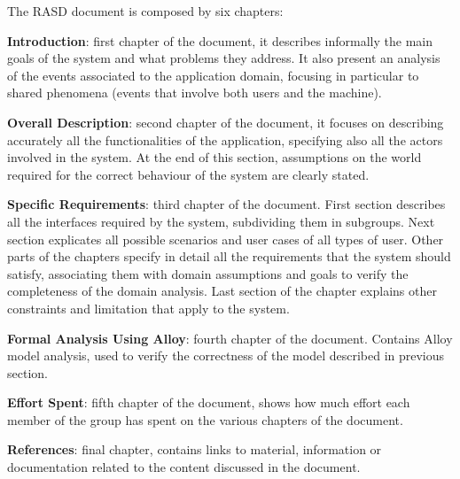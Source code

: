 The RASD document is composed by six chapters:

\textbf{Introduction}: first chapter of the document, it describes informally the main goals of the system and what problems they address. It also present an analysis of the events associated to the application domain, focusing in particular to shared phenomena (events that involve both users and the machine).

\textbf{Overall Description}: second chapter of the document, it focuses on describing accurately all the functionalities of the application, specifying also all the actors involved in the system. At the end of this section, assumptions on the world required for the correct behaviour of the system are clearly stated. 

\textbf{Specific Requirements}: third chapter of the document. First section describes all the interfaces required by the system, subdividing them in subgroups. Next section explicates all possible scenarios and user cases of all types of user. Other parts of the chapters specify in detail all the requirements that the system should satisfy, associating them with domain assumptions and goals to verify the completeness of the domain analysis. Last section of the chapter explains other constraints and limitation that apply to the system.

\textbf{Formal Analysis Using Alloy}: fourth chapter of the document. Contains Alloy model analysis, used to verify the correctness of the model described in previous section. 

\textbf{Effort Spent}: fifth chapter of the document, shows how much effort each member of the group has spent on the various chapters of the document.

\textbf{References}: final chapter, contains links to material, information or documentation related to the content discussed in the document.